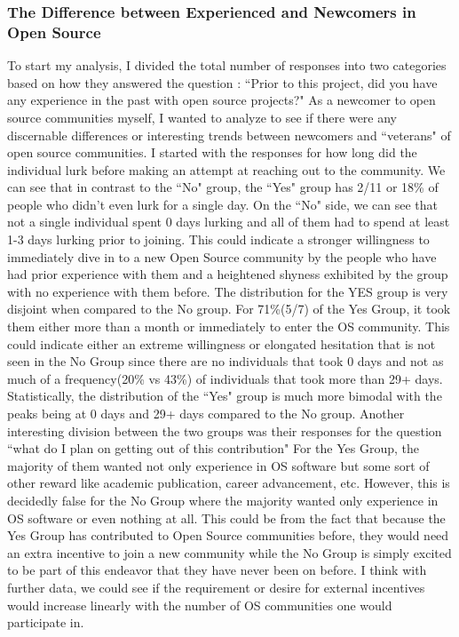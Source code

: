 \subsubsection{The Difference between Experienced and Newcomers in Open Source}

To start my analysis, I divided the total number of responses into two categories based on how they answered the question : ``Prior to this project, did you have any experience in the past with open source projects?"
As a newcomer to open source communities myself, I wanted to analyze to {\bold see if there were any discernable differences or interesting trends between newcomers and ``veterans" of open source communities.} 
I started with the responses for how long did the individual lurk before making an attempt at reaching out to the community. We can see that in contrast to the ``No" group, the ``Yes" group has 2/11 or 18\% of people who didn't even lurk for a single day. On the  ``No" side, we can see that not  a single individual spent 0 days lurking and all of them had to spend at least 1-3 days lurking prior to joining.  This could indicate a stronger willingness to immediately dive in to a new Open Source community by the people who have had prior experience with them and a heightened shyness exhibited by the group with no experience with them before. The distribution for the YES  group is very disjoint when compared to the No group. For 71\%(5/7) of the Yes Group, it took them either more than a month or immediately to enter the OS community. This could indicate either {\italic an extreme willingness or elongated hesitation that is not seen in the No Group} since there are no individuals that took 0 days and not as much of a frequency(20\% vs 43\%) of individuals that took more than 29+ days.  Statistically, {\italic the distribution of the ``Yes" group is much more bimodal} with the peaks being at 0 days and 29+ days compared to the No group. 
 	Another interesting division between the two groups was their responses for the question ``what do  I plan on getting out of this contribution" For the Yes Group, the majority of them wanted not only experience in OS software but some sort of other reward like academic publication, career advancement, etc. However, this is decidedly false for the No Group where the majority wanted only experience in OS software or even nothing at all. This could be from the fact that because the Yes Group has contributed to Open Source communities before, they would need an extra incentive to join a new community while the No Group is simply excited to be part of this endeavor that they have never been on before. I think with further data, we could see if the requirement or desire for external incentives would increase linearly with the number of OS communities one would participate in.


